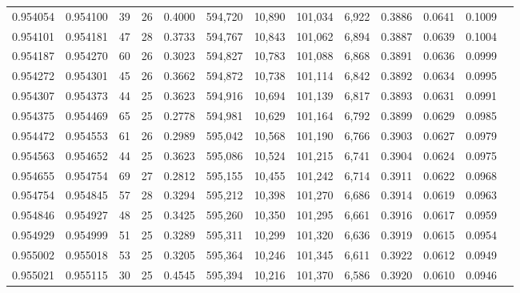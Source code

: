 \begin{tabular}{rrrrrrrrrrrrr}
0.954054 & 0.954100 &    39 &  26 &                                     0.4000 & 594,720 &  10,890 & 101,034 &   6,922 & 0.3886 & 0.0641 & 0.1009 \\
0.954101 & 0.954181 &    47 &  28 &                                     0.3733 & 594,767 &  10,843 & 101,062 &   6,894 & 0.3887 & 0.0639 & 0.1004 \\
0.954187 & 0.954270 &    60 &  26 &                                     0.3023 & 594,827 &  10,783 & 101,088 &   6,868 & 0.3891 & 0.0636 & 0.0999 \\
0.954272 & 0.954301 &    45 &  26 &                                     0.3662 & 594,872 &  10,738 & 101,114 &   6,842 & 0.3892 & 0.0634 & 0.0995 \\
0.954307 & 0.954373 &    44 &  25 &                                     0.3623 & 594,916 &  10,694 & 101,139 &   6,817 & 0.3893 & 0.0631 & 0.0991 \\
0.954375 & 0.954469 &    65 &  25 &                                     0.2778 & 594,981 &  10,629 & 101,164 &   6,792 & 0.3899 & 0.0629 & 0.0985 \\
0.954472 & 0.954553 &    61 &  26 &                                     0.2989 & 595,042 &  10,568 & 101,190 &   6,766 & 0.3903 & 0.0627 & 0.0979 \\
0.954563 & 0.954652 &    44 &  25 &                                     0.3623 & 595,086 &  10,524 & 101,215 &   6,741 & 0.3904 & 0.0624 & 0.0975 \\
0.954655 & 0.954754 &    69 &  27 &                                     0.2812 & 595,155 &  10,455 & 101,242 &   6,714 & 0.3911 & 0.0622 & 0.0968 \\
0.954754 & 0.954845 &    57 &  28 &                                     0.3294 & 595,212 &  10,398 & 101,270 &   6,686 & 0.3914 & 0.0619 & 0.0963 \\
0.954846 & 0.954927 &    48 &  25 &                                     0.3425 & 595,260 &  10,350 & 101,295 &   6,661 & 0.3916 & 0.0617 & 0.0959 \\
0.954929 & 0.954999 &    51 &  25 &                                     0.3289 & 595,311 &  10,299 & 101,320 &   6,636 & 0.3919 & 0.0615 & 0.0954 \\
0.955002 & 0.955018 &    53 &  25 &                                     0.3205 & 595,364 &  10,246 & 101,345 &   6,611 & 0.3922 & 0.0612 & 0.0949 \\
0.955021 & 0.955115 &    30 &  25 &                                     0.4545 & 595,394 &  10,216 & 101,370 &   6,586 & 0.3920 & 0.0610 & 0.0946 \\

\end{tabular}

